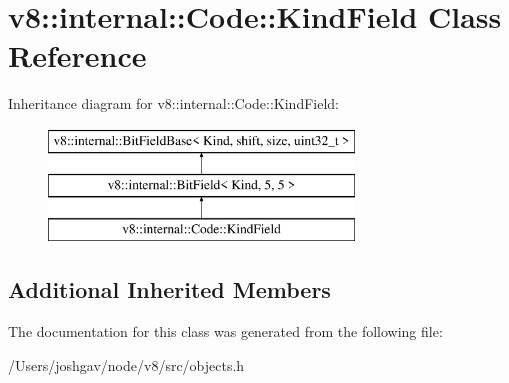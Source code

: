 \hypertarget{classv8_1_1internal_1_1_code_1_1_kind_field}{}\section{v8\+:\+:internal\+:\+:Code\+:\+:Kind\+Field Class Reference}
\label{classv8_1_1internal_1_1_code_1_1_kind_field}
Inheritance diagram for v8\+:\+:internal\+:\+:Code\+:\+:Kind\+Field\+:\begin{figure}[H]
\begin{center}
\leavevmode
\includegraphics[height=3.000000cm]{classv8_1_1internal_1_1_code_1_1_kind_field}
\end{center}
\end{figure}
\subsection*{Additional Inherited Members}


The documentation for this class was generated from the following file\+:\begin{DoxyCompactItemize}
\item 
/\+Users/joshgav/node/v8/src/objects.\+h\end{DoxyCompactItemize}
